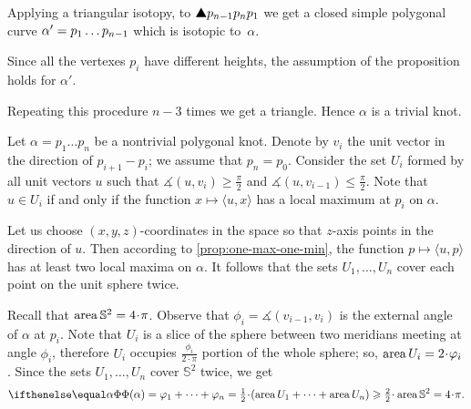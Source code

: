 Applying a triangular isotopy, to $\solidtriangle p_{n-1}p_np_1$ we get a closed simple polygonal curve $\alpha'\z=p_1\dots p_{n-1}$ which is isotopic to~$\alpha$.

Since all the vertexes $p_i$ have different heights,
the assumption of the proposition holds for $\alpha'$.

Repeating this procedure $n-3$ times we get a triangle.
Hence $\alpha$ is a trivial knot.
\qeds

Let $\alpha=p_1\dots p_n$ be a nontrivial polygonal knot.
Denote by $v_i$ the unit vector in the direction of $p_{i+1}-p_i$;
we assume that $p_n=p_0$.
Consider the set $U_i$ formed by all unit vectors $u$ such that $\measuredangle(u,v_i)\ge \tfrac \pi 2$ and $\measuredangle(u,v_{i-1})\le \tfrac \pi 2$.
Note that $u\in U_i$ if and only if the function $x\mapsto \langle u,x\rangle$ has a local maximum at $p_i$ on $\alpha$.

Let us choose $(x,y,z)$-coordinates in the space so that $z$-axis points in the direction of $u$.
Then according to \ref{prop:one-max-one-min}, the function $p\mapsto \langle u,p\rangle$ has at least two local maxima on $\alpha$.
It follows that the sets $U_1,\dots,U_n$ cover each point on the unit sphere twice.

Recall that $\area \mathbb{S}^2=4\cdot\pi$.
Observe that $\phi_i=\measuredangle(v_{i-1},v_i)$ is the external angle of $\alpha$ at $p_i$.
Note that $U_i$ is a slice of the sphere between two meridians meeting at angle $\phi_i$, therefore $U_i$ occupies $\tfrac{\phi_i}{2\cdot\pi}$ portion of the whole sphere; so, $\area U_i=2\cdot \phi_i$.
Since the sets $U_1, \dots, U_n$ cover $\mathbb{S}^2$ twice, we get
\[\tc\alpha=\phi_1+\dots+\phi_n=\tfrac12\cdot (\area U_1+\dots+\area U_n)\ge \tfrac22\cdot \area\mathbb{S}^2=4\cdot\pi.\]
\qedsf



